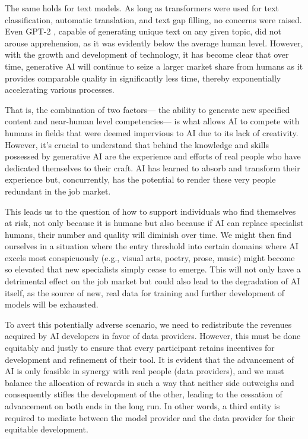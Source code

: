 \documentclass[12pt, letterpaper]{article}
\begin{document}
The same holds for text models. As long as transformers were used for text classification, automatic translation, and text gap filling, no concerns were raised. Even GPT-2 \cite{radford2019language}, capable of generating unique text on any given topic, did not arouse apprehension, as it was evidently below the average human level. However, with the growth and development of technology, it has become clear that over time, generative AI will continue to seize a larger market share from humans as it provides comparable quality in significantly less time, thereby exponentially accelerating various processes.

That is, the combination of two factors— the ability to generate new specified content and near-human level competencies— is what allows AI to compete with humans in fields that were deemed impervious to AI due to its lack of creativity. However, it’s crucial to understand that behind the knowledge and skills possessed by generative AI are the experience and efforts of real people who have dedicated themselves to their craft. AI has learned to absorb and transform their experience but, concurrently, has the potential to render these very people redundant in the job market.

This leads us to the question of how to support individuals who find themselves at risk, not only because it is humane but also because if AI can replace specialist humans, their number and quality will diminish over time. We might then find ourselves in a situation where the entry threshold into certain domains where AI excels most conspicuously (e.g., visual arts, poetry, prose, music) might become so elevated that new specialists simply cease to emerge. This will not only have a detrimental effect on the job market but could also lead to the degradation of AI itself, as the source of new, real data for training and further development of models will be exhausted.

To avert this potentially adverse scenario, we need to redistribute the revenues acquired by AI developers in favor of data providers. However, this must be done equitably and justly to ensure that every participant retains incentives for development and refinement of their tool. It is evident that the advancement of AI is only feasible in synergy with real people (data providers), and we must balance the allocation of rewards in such a way that neither side outweighs and consequently stifles the development of the other, leading to the cessation of advancement on both ends in the long run. In other words, a third entity is required to mediate between the model provider and the data provider for their equitable development.
\end{document}
